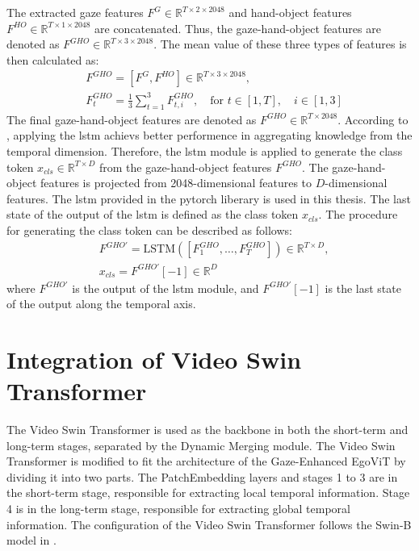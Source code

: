 The extracted gaze features $F^{G} \in \mathbb{R}^{T \times 2 \times 2048}$ and hand-object features $F^{HO} \in \mathbb{R}^{T \times 1 \times 2048}$ are concatenated. Thus, the gaze-hand-object features are denoted as $F^{GHO} \in \mathbb{R}^{T \times 3 \times 2048}$.  The mean value of these three types of features is then calculated as:
\begin{equation}
    \begin{aligned}
        &F^{GHO} = [F^{G}, F^{HO}] \in \mathbb{R}^{T \times 3 \times 2048}, \\[12pt]
        &F^{GHO}_{t} = \frac{1}{3} \sum_{t=1}^{3} F^{GHO}_{t,i}, \quad \text{for } t \in [1, T], \quad i \in [1, 3]
    \end{aligned}
    \label{eq:mean_feature}
\end{equation}
The final gaze-hand-object features are denoted as $F^{GHO} \in \mathbb{R}^{T \times 2048}$. According to \cite{pan_egovit_2023}, applying the \gls{lstm} achievs better performence in aggregating knowledge from the temporal dimension. Therefore, the \gls{lstm} module is applied to generate the class token $x_{cls} \in \mathbb{R}^{T \times D}$ from the gaze-hand-object features $F^{GHO}$. The gaze-hand-object features is projected from 2048-dimensional features to $D$-dimensional features. The \gls{lstm} provided in the pytorch liberary is used in this thesis. The last state of the output of the \gls{lstm} is defined as the class token $x_{cls}$. The procedure for generating the class token can be described as follows:
\begin{equation}
    \begin{aligned}
        &F^{GHO'} = \text{LSTM}([F^{GHO}_1,\ldots , F^{GHO}_T]) \in \mathbb{R}^{T \times D}, \\[12pt]
        &x_{cls} = F^{GHO'}[-1] \in \mathbb{R}^{D}
    \end{aligned}
    \label{eq:class_token}
\end{equation}
where $F^{GHO'}$ is the output of the \gls{lstm} module, and $F^{GHO'}[-1]$ is the last state of the output along the temporal axis.

\section{Integration of Video Swin Transformer}
\label{sec:Integration of Video Swin Transformer}
The Video Swin Transformer is used as the backbone in both the short-term and long-term stages, separated by the Dynamic Merging module. The Video Swin Transformer is modified to fit the architecture of the Gaze-Enhanced EgoViT by dividing it into two parts. The PatchEmbedding layers and stages 1 to 3 are in the short-term stage, responsible for extracting local temporal information. Stage 4 is in the long-term stage, responsible for extracting global temporal information. The configuration of the Video Swin Transformer follows the Swin-B model in \cite{liu_video_2021}.

